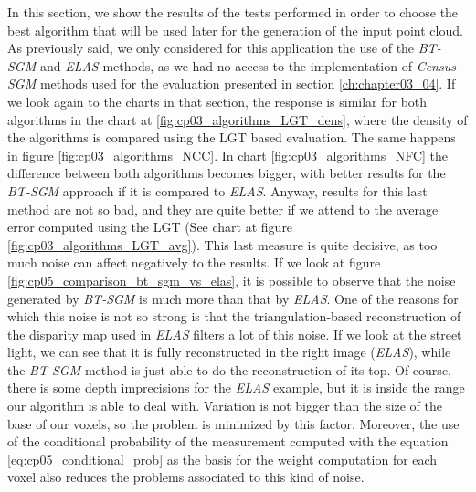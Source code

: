 In this section, we show the results of the tests performed in order to choose the best algorithm that will be used later for the generation of the input point cloud. As previously said, we only considered for this application the use of the \emph{BT-SGM} and \emph{ELAS} methods, as we had no access to the implementation of \emph{Census-SGM} methods used for the evaluation presented in section \ref{ch:chapter03_04}. If we look again to the charts in that section, the response is similar for both algorithms in the chart at \ref{fig:cp03_algorithms_LGT_dens}, where the density of the algorithms is compared using the \ac{LGT} based evaluation. The same happens in figure \ref{fig:cp03_algorithms_NCC}. In chart \ref{fig:cp03_algorithms_NFC} the difference between both algorithms becomes bigger, with better results for the \emph{BT-SGM} approach if it is compared to \emph{ELAS}. Anyway, results for this last method are not so bad, and they are quite better if we attend to the average error computed using the \ac{LGT} (See chart at figure \ref{fig:cp03_algorithms_LGT_avg}). This last measure is quite decisive, as too much noise can affect negatively to the results. If we look at figure \ref{fig:cp05_comparison_bt_sgm_vs_elas}, it is possible to observe that the noise generated by \emph{BT-SGM} is much more than that by \emph{ELAS}. One of the reasons for which this noise is not so strong is that the triangulation-based reconstruction of the disparity map used in \emph{ELAS} filters a lot of this noise. If we look at the street light, we can see that it is fully reconstructed in the right image (\emph{ELAS}), while the \emph{BT-SGM} method is just able to do the reconstruction of its top. Of course, there is some depth imprecisions for the \emph{ELAS} example, but it is inside the range our algorithm is able to deal with. Variation is not bigger than the size of the base of our voxels, so the problem is minimized by this factor. Moreover, the use of the conditional probability of the measurement computed with the equation \ref{eq:cp05_conditional_prob} as the basis for the weight computation for each voxel also reduces the problems associated to this kind of noise.


